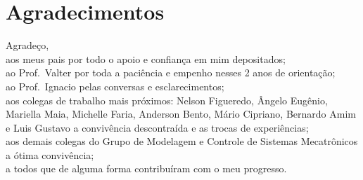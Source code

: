 
\chapter*{Agradecimentos}

\noindent Agradeço,\\[2mm]
aos meus pais por todo o apoio e confiança em mim depositados;\\[2mm]
ao Prof.\ Valter por toda a paciência e empenho nesses 2 anos de orientação;\\[2mm]
ao Prof.\ Ignacio pelas conversas e esclarecimentos;\\[2mm]
aos colegas de trabalho mais próximos: Nelson Figueredo, Ângelo Eugênio,
Mariella Maia, Michelle Faria, Anderson Bento, Mário Cipriano, Bernardo Amim e
Luis Gustavo a convivência descontraída e as trocas de experiências;\\[2mm]
aos demais colegas do Grupo de Modelagem e Controle de Sistemas Mecatrônicos a
ótima convivência;\\[2mm]
a todos que de alguma forma contribuíram com o meu progresso.

\thispagestyle{plain}
\cleardoublepage{}
